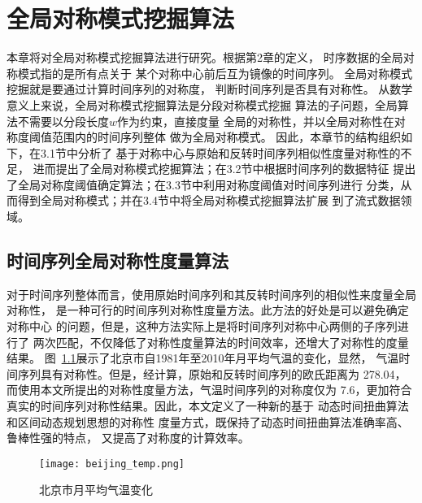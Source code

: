
\chapter{全局对称模式挖掘算法}

本章将对全局对称模式挖掘算法进行研究。根据第2章的定义，
时序数据的全局对称模式指的是所有点关于
某个对称中心前后互为镜像的时间序列。
全局对称模式挖掘就是要通过计算时间序列的对称度，
判断时间序列是否具有对称性。
从数学意义上来说，全局对称模式挖掘算法是分段对称模式挖掘
算法的子问题，全局算法不需要以分段长度$w$作为约束，直接度量
全局的对称性，并以全局对称性在对称度阈值范围内的时间序列整体
做为全局对称模式。
因此，本章节的结构组织如下，在3.1节中分析了
基于对称中心与原始和反转时间序列相似性度量对称性的不足，
进而提出了全局对称模式挖掘算法；在3.2节中根据时间序列的数据特征
提出了全局对称度阈值确定算法；在3.3节中利用对称度阈值对时间序列进行
分类，从而得到全局对称模式；并在3.4节中将全局对称模式挖掘算法扩展
到了流式数据领域。

\section{时间序列全局对称性度量算法}

对于时间序列整体而言，使用原始时间序列和其反转时间序列的相似性来度量全局对称性，
是一种可行的时间序列对称性度量方法。此方法的好处是可以避免确定对称中心
的问题，但是，这种方法实际上是将时间序列对称中心两侧的子序列进行了
两次匹配，不仅降低了对称性度量算法的时间效率，还增大了对称性的度量结果。
图~\ref{fig:beijing_temp}展示了北京市自1981年至2010年月平均气温的变化，显然，
气温时间序列具有对称性。但是，经计算，原始和反转时间序列的欧氏距离为
278.04，而使用本文所提出的对称性度量方法，气温时间序列的对称度仅为
7.6，更加符合真实的时间序列对称性结果。因此，本文定义了一种新的基于
动态时间扭曲算法和区间动态规划思想的对称性
度量方式，既保持了动态时间扭曲算法准确率高、鲁棒性强的特点，
又提高了对称度的计算效率。
\begin{figure}
  \centering
  \texttt{[image: beijing\_temp.png]}
  \caption{北京市月平均气温变化}
  \label{fig:beijing_temp}
\end{figure}

